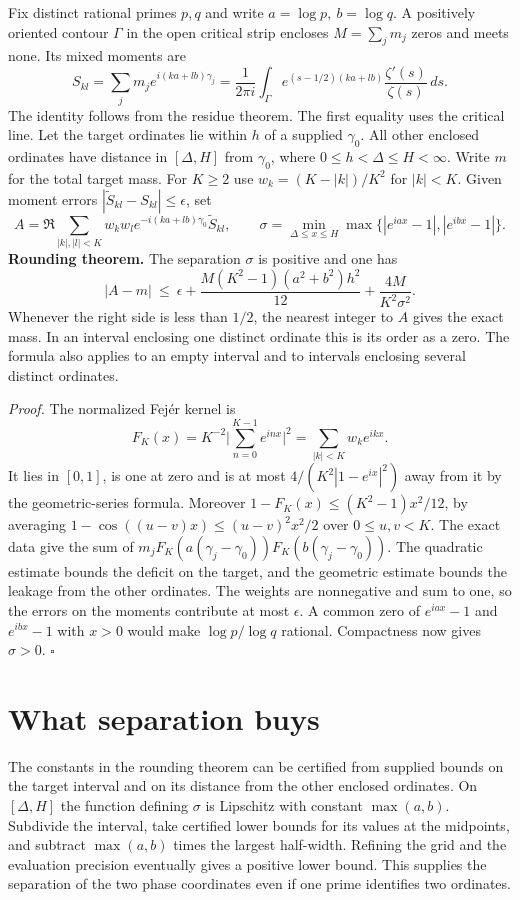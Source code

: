 \documentclass[11pt,a4paper]{article}
\begin{document}
Fix distinct rational primes $p,q$ and write $a=\log p,\ b=\log q$. A positively oriented contour
$\Gamma$ in the open critical strip encloses $M=\sum_j m_j$ zeros and meets none. Its mixed moments are
\[
 S_{kl}=\sum_j m_j e^{i(ka+lb)\gamma_j}
 =\frac1{2\pi i}\int_\Gamma e^{(s-1/2)(ka+lb)}
                 \frac{\zeta'(s)}{\zeta(s)}\,ds .
\]
The identity follows from the residue theorem. The first equality uses the critical line. Let the
target ordinates lie within $h$ of a supplied $\gamma_0$. All other enclosed ordinates have distance
in $[\Delta,H]$ from $\gamma_0$, where $0\le h<\Delta\le H<\infty$. Write $m$ for the total target mass.
For $K\ge2$ use $w_k=(K-|k|)/K^2$ for $|k|<K$. Given moment errors
$|\widetilde S_{kl}-S_{kl}|\le\epsilon$, set
\[
 A=\Re\sum_{|k|,|l|<K} w_k w_l e^{-i(ka+lb)\gamma_0}\widetilde S_{kl},\qquad
 \sigma=\min_{\Delta\le x\le H}\max\{|e^{iax}-1|,|e^{ibx}-1|\}.
\]
\textbf{Rounding theorem.} The separation $\sigma$ is positive and one has
\[
 |A-m|\ \le\ \epsilon+
 \frac{M(K^2-1)(a^2+b^2)h^2}{12}+
 \frac{4M}{K^2\sigma^2}.
\]
Whenever the right side is less than $1/2$, the nearest integer to $A$ gives the exact mass. In an
interval enclosing one distinct ordinate this is its order as a zero. The formula also applies
to an empty interval and to intervals enclosing several distinct ordinates.

\textit{Proof.} The normalized Fejér kernel is
\[
 F_K(x)=K^{-2}\Big|\sum_{n=0}^{K-1}e^{inx}\Big|^2
       =\sum_{|k|<K}w_ke^{ikx}.
\]
It lies in $[0,1]$, is one at zero and is at most $4/(K^2|1-e^{ix}|^2)$ away from it by the
geometric-series formula. Moreover
$1-F_K(x)\le(K^2-1)x^2/12$, by averaging
$1-\cos((u-v)x)\le (u-v)^2x^2/2$ over $0\le u,v<K$.
The exact data give the sum of $m_j F_K(a(\gamma_j-\gamma_0))F_K(b(\gamma_j-\gamma_0))$.
The quadratic estimate bounds the deficit on the target, and the geometric estimate bounds the
leakage from the other ordinates. The weights are nonnegative and sum to one, so the errors on the
moments contribute at most $\epsilon$. A common zero of $e^{iax}-1$ and $e^{ibx}-1$ with
$x>0$ would make $\log p/\log q$ rational. Compactness now gives $\sigma>0$. \hfill$\square$

\newpage
\section*{What separation buys}
The constants in the rounding theorem can be certified from supplied bounds on the target
interval and on its distance from the other enclosed ordinates. On $[\Delta,H]$ the function
defining $\sigma$ is Lipschitz with constant $\max(a,b)$. Subdivide the interval, take certified
lower bounds for its values at the midpoints, and subtract $\max(a,b)$ times the largest half-width.
Refining the grid and the evaluation precision eventually gives a positive lower bound.
This supplies the separation of the two phase coordinates even if one prime identifies two ordinates.
\end{document}
